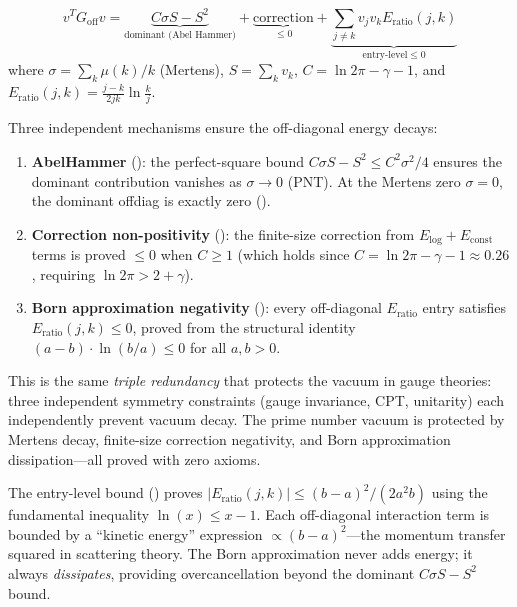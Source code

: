 \begin{equation}
  v^T G_{\mathrm{off}} v = \underbrace{C\sigma S - S^2}_{\text{dominant (Abel Hammer)}}
  + \underbrace{\text{correction}}_{\leq 0}
  + \underbrace{\sum_{j \neq k} v_j v_k E_{\mathrm{ratio}}(j,k)}_{\text{entry-level} \leq 0}
  \label{eq:triple-redundancy}
\end{equation}
where $\sigma = \sum_k \mu(k)/k$ (Mertens), $S = \sum_k v_k$,
$C = \ln 2\pi - \gamma - 1$, and $E_{\mathrm{ratio}}(j,k) =
\frac{j-k}{2jk}\ln\frac{k}{j}$.

\begin{principle}
\label{princ:triple}
Three independent mechanisms ensure the off-diagonal energy decays:
\begin{enumerate}
  \item \textbf{AbelHammer} ():
    the perfect-square bound $C\sigma S - S^2 \leq C^2\sigma^2/4$ ensures
    the dominant contribution vanishes as $\sigma \to 0$ (PNT). At the
    Mertens zero $\sigma = 0$, the dominant offdiag is exactly zero
    ().
  \item \textbf{Correction non-positivity} ():
    the finite-size correction from $E_{\mathrm{log}} + E_{\mathrm{const}}$
    terms is proved $\leq 0$ when $C \geq 1$ (which holds since
    $C = \ln 2\pi - \gamma - 1 \approx 0.26$, requiring $\ln 2\pi > 2 + \gamma$).
  \item \textbf{Born approximation negativity} ():
    every off-diagonal $E_{\mathrm{ratio}}$ entry satisfies
    $E_{\mathrm{ratio}}(j,k) \leq 0$, proved from the structural identity
    $(a - b) \cdot \ln(b/a) \leq 0$ for all $a, b > 0$.
\end{enumerate}
This is the same \emph{triple redundancy} that protects the vacuum in
gauge theories: three independent symmetry constraints (gauge invariance,
CPT, unitarity) each independently prevent vacuum decay. The prime number
vacuum is protected by Mertens decay, finite-size correction negativity,
and Born approximation dissipation---all proved with zero axioms.
\end{principle}

\begin{correspondence}
The entry-level bound () proves
$|E_{\mathrm{ratio}}(j,k)| \leq (b-a)^2/(2a^2 b)$ using the
fundamental inequality $\ln(x) \leq x - 1$. Each off-diagonal
interaction term is bounded by a ``kinetic energy'' expression
$\propto (b-a)^2$---the momentum transfer squared in scattering
theory. The Born approximation never adds energy; it always
\emph{dissipates}, providing overcancellation beyond the dominant
$C\sigma S - S^2$ bound.
\end{correspondence}

